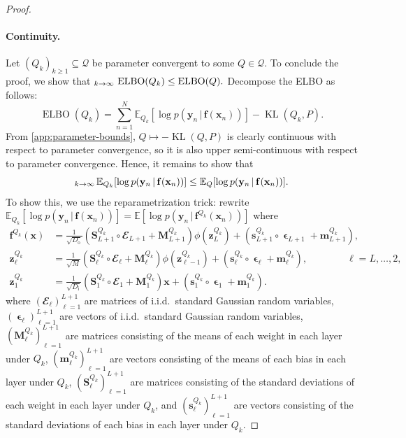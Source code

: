 \documentclass[twoside]{article}
\renewcommand{\ss}[1]{_{\text{#1}}}
\newcommand{\vf}{\mathbf{f}}
\newcommand{\vm}{\mathbf{m}}
\newcommand{\vs}{\mathbf{s}}
\newcommand{\vx}{\mathbf{x}}
\newcommand{\vy}{\mathbf{y}}
\newcommand{\vz}{\mathbf{z}}
\newcommand{\vep}{\bm{\upvarepsilon}}
\newcommand{\mM}{\mathbf{M}}
\newcommand{\mS}{\mathbf{S}}
\newcommand{\E}{\mathbb{E}}
\newcommand{\Q}{\mathbb{Q}}
\renewcommand{\Q}{\ensuremath{Q}}
\newcommand{\sub}{\subseteq}
\newcommand{\opspace}{}
\let\limsup\relax\DeclareMathOperator*{\limsup}{lim\,sup\opspace}
\newcommand{\KL}{\operatorname{KL}}
\newcommand{\cond}{\,|\,}                  %
\renewcommand{\ss}[1]{_{\text{#1}}}        %
\theoremstyle{theoremstyle}
\begin{document}
\begin{proof}
\paragraph{Continuity.}
Let $(Q_k)_{k \ge 1} \sub \mathcal{Q}$ be parameter convergent to some $Q \in \mathcal{Q}$.
To conclude the proof, we show that
$
    \limsup_{k \to \infty}\, \ELBO(Q_k) \le \ELBO(Q).
$
Decompose the ELBO as follows:
\begin{equation} \textstyle
    \operatorname{ELBO}(Q_k)
    = \sum_{n=1}^{N}\E_{Q_k}[\log p(\vy_n \cond \vf(\vx_n))] - \KL(Q_k, P).
\end{equation}
From \cref{app:parameter-bounds}, $Q \mapsto {-\KL}(Q, P)$ is clearly continuous with respect to parameter convergence, so it is also upper semi-continuous with respect to parameter convergence.
Hence, it remains to show that
\begin{equation}
    \limsup_{k \to \infty}\,\E_{Q_k}[\log p(\vy_n \cond \vf(\vx_n))]
    \le \E_{Q}[\log p(\vy_n \cond \vf(\vx_n))].
\end{equation}
To show this, we use the reparametrization trick:
rewrite $\E_{Q_k}[\log p(\vy_n \cond \vf(\vx_n))] = \E[\log p(\vy_n \cond \vf^{Q_k}(\vx_n))]$ where
\begin{align}
    \vf^{Q_k}(\vx) &= \tfrac1{\sqrt{D\ss{o}}}(\mS^{Q_k}_{L+1} \circ \mathbfcal{E}_{L+1} + \mM^{Q_k}_{L+1}) \phi(\vz^{Q_k}_{L}) + (\vs^{Q_k}_{L+1} \circ \vep_{L+1} + \vm^{Q_k}_{L+1}), \\
    \vz^{Q_k}_\ell
    &= \tfrac1{\sqrt{M}}(\mS^{Q_k}_\ell \circ \mathbfcal{E}_\ell + \mM^{Q_k}_\ell) \phi(\vz^{Q_k}_{\ell-1}) + (\vs^{Q_k}_\ell \circ \vep_\ell + \vm^{Q_k}_\ell),
    \qquad\qquad \ell = L, \ldots, 2, \\
    \vz^{Q_k}_1
    &= \tfrac1{\sqrt{D\ss{i}}}(\mS^{Q_k}_1 \circ \mathbfcal{E}_1 + \mM^{Q_k}_1) \vx + (\vs^{Q_k}_1 \circ \vep_1 + \vm^{Q_k}_1).
\end{align}
where $(\mathbfcal{E}_\ell)_{\ell=1}^{L+1}$ are matrices of i.i.d.~standard Gaussian random variables, $(\vep_\ell)_{\ell=1}^{L+1}$ are vectors of i.i.d.~standard Gaussian random variables,
$(\mM^{Q_k}_\ell)_{\ell=1}^{L+1}$ are matrices consisting of the means of each weight in each layer under $\Q_k$,
$(\vm^{Q_k}_\ell)_{\ell=1}^{L+1}$ are vectors consisting of the means of each bias in each layer under $\Q_k$, 
$(\mS^{Q_k}_\ell)_{\ell=1}^{L+1}$ are matrices consisting of the standard deviations of each weight in each layer under $\Q_k$, and
$(\vs^{Q_k}_\ell)_{\ell=1}^{L+1}$ are vectors consisting of the standard deviations of each bias in each layer under $\Q_k$.

\end{proof}
\end{document}
